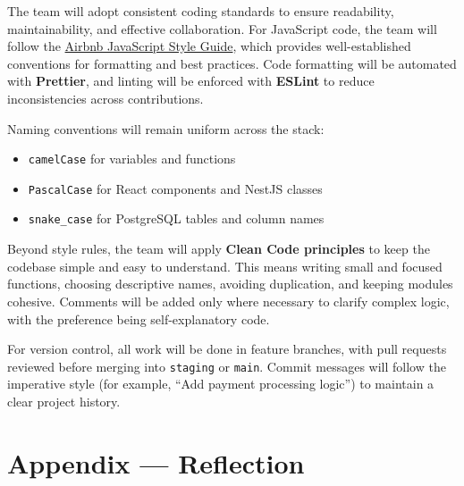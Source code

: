 \documentclass{article}
\begin{document}
The team will adopt consistent coding standards to ensure readability, maintainability, and effective collaboration. For JavaScript code, the team will follow the \href{https://github.com/airbnb/javascript}{Airbnb JavaScript Style Guide}, which provides well-established conventions for formatting and best practices. Code formatting will be automated with \textbf{Prettier}, and linting will be enforced with \textbf{ESLint} to reduce inconsistencies across contributions.

Naming conventions will remain uniform across the stack:
\begin{itemize}
  \item \texttt{camelCase} for variables and functions
  \item \texttt{PascalCase} for React components and NestJS classes
  \item \texttt{snake\_case} for PostgreSQL tables and column names
\end{itemize}

Beyond style rules, the team will apply \textbf{Clean Code principles} to keep the codebase simple and easy to understand. This means writing small and focused functions, choosing descriptive names, avoiding duplication, and keeping modules cohesive. Comments will be added only where necessary to clarify complex logic, with the preference being self-explanatory code.

For version control, all work will be done in feature branches, with pull requests reviewed before merging into \texttt{staging} or \texttt{main}. Commit messages will follow the imperative style (for example, “Add payment processing logic”) to maintain a clear project history.

\newpage{}

\section*{Appendix --- Reflection}
\end{document}
